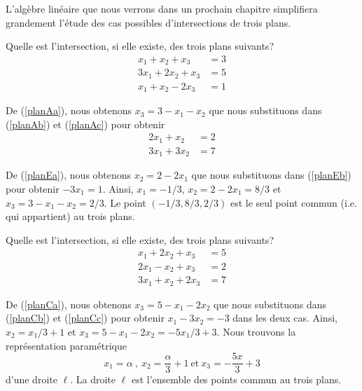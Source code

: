{L'algèbre linéaire que nous verrons dans un prochain chapitre simplifiera
grandement l'étude des cas possibles d'intersections de trois plans.

\begin{egg}
Quelle est l'intersection, si elle existe, des trois plans suivants?
\begin{subequations}\label{PlanA}
\begin{align}
x_1 + x_2 + x_3 &= 3 \label{planAa} \\
3x_1 + 2x_2 + x_3 &= 5 \label{planAb} \\
x_1 + x_2 - 2x_3 &= 1 \label{planAc}
\end{align}
\end{subequations}

De (\ref{planAa}), nous obtenons $x_3=3-x_1-x_2$ que nous substituons dans
(\ref{planAb}) et (\ref{planAc}) pour obtenir
\begin{subequations}\label{PlanE}
\begin{align}
2x_1 + x_2 &= 2 \label{planEa}\\
3x_1 + 3x_2 &= 7 \label{planEb}
\end{align}
\end{subequations}

De (\ref{planEa}), nous obtenons $x_2=2-2x_1$ que nous substituons dans
(\ref{planEb}) pour obtenir $-3x_1 = 1$.  Ainsi, $x_1=-1/3$, $x_2=2-2x_1=8/3$
et $x_3=3-x_1-x_2 = 2/3$.  Le point $(-1/3, 8/3 , 2/3)$ est le seul point
commun (i.e. qui appartient) au trois plans.
\end{egg}

\begin{egg}
Quelle est l'intersection, si elle existe, des trois plans suivants?
\begin{subequations}\label{PlanC}
\begin{align}
x_1 + 2x_2 +x_3 &= 5 \label{planCa}\\ 
2x_1 -x_2 + x_3 &= 2 \label{planCb}\\
3x_1 + x_2 + 2x_3 &= 7 \label{planCc}
\end{align}
\end{subequations}

De (\ref{planCa}), nous obtenons $x_3=5-x_1-2x_2$ que nous substituons dans
(\ref{planCb}) et (\ref{planCc}) pour obtenir $x_1 -3 x_2 = -3$ dans les deux
cas.   Ainsi, $x_2= x_1/3  + 1$ et $x_3=5-x_1-2x_2 = - 5x_1/3 + 3$.  Nous
trouvons la représentation paramétrique
\[
x_1=\alpha \ , \ x_2 = \frac{\alpha}{3} + 1 \ \text{et}
\ x_3 = -\frac{5x}{3} + 3
\]
d'une droite $\ell$.  La droite $\ell$ est l'ensemble des points
commun au trois plans.
\end{egg}

}
